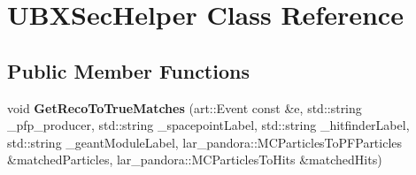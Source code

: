 \hypertarget{classUBXSecHelper}{\section{\-U\-B\-X\-Sec\-Helper \-Class \-Reference}
\label{classUBXSecHelper}
}
\subsection*{\-Public \-Member \-Functions}
\begin{DoxyCompactItemize}
\item 
\hypertarget{classUBXSecHelper_a0bc1ff387b79732ea8d365ad296a22fb}{void {\bfseries \-Get\-Reco\-To\-True\-Matches} (art\-::\-Event const \&e, std\-::string \-\_\-pfp\-\_\-producer, std\-::string \-\_\-spacepoint\-Label, std\-::string \-\_\-hitfinder\-Label, std\-::string \-\_\-geant\-Module\-Label, lar\-\_\-pandora\-::\-M\-C\-Particles\-To\-P\-F\-Particles \&matched\-Particles, lar\-\_\-pandora\-::\-M\-C\-Particles\-To\-Hits \&matched\-Hits)}\label{classUBXSecHelper_a0bc1ff387b79732ea8d365ad296a22fb}

\end{DoxyCompactItemize}
